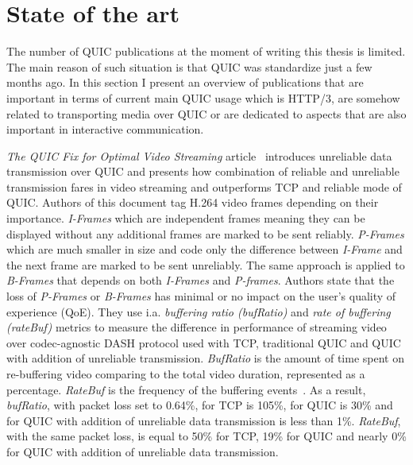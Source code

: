 \section{State of the art}
\label{sec:state-of-the-art}

The number of QUIC publications at the moment of writing this thesis is limited.
The main reason of such situation is that QUIC was standardize just a few months ago.
In this section I present an overview of publications that are important in terms of current main QUIC usage which is
HTTP/3, are somehow related to transporting media over QUIC or are dedicated to aspects that are also important
in interactive communication.

\textit{The QUIC Fix for Optimal Video Streaming} article~\cite{the-quic-fix-for-optimal-video-streaming} introduces unreliable data transmission over QUIC and presents how combination of reliable and unreliable transmission fares in video streaming and outperforms TCP and reliable mode of QUIC\@.
Authors of this document tag H.264 video frames depending on their importance.
\textit{I-Frames} which are independent frames meaning they can be displayed without any additional frames are marked to be sent reliably.
\textit{P-Frames} which are much smaller in size and code only the difference between \textit{I-Frame} and the next frame are marked to be sent unreliably.
The same approach is applied to \textit{B-Frames} that depends on both \textit{I-Frames} and \textit{P-frames}.
Authors state that the loss of \textit{P-Frames} or \textit{B-Frames} has minimal or no impact on the user's quality of experience (QoE).
They use i.a. \textit{buffering ratio (bufRatio)} and \textit{rate of buffering (rateBuf)} metrics to measure the difference in performance of streaming video over codec-agnostic DASH protocol used with TCP, traditional QUIC and QUIC with addition of unreliable transmission.
\textit{BufRatio} is the amount of time spent on re-buffering video comparing to the total video duration, represented as a percentage.
\textit{RateBuf} is the frequency of the buffering events~\cite{impact-of-video-quality-on-user-engagement}.
As a result, \textit{bufRatio}, with packet loss set to 0.64\%, for TCP is 105\%, for QUIC is 30\% and for QUIC with addition of unreliable data transmission is less than 1\%.
\textit{RateBuf}, with the same packet loss, is equal to 50\% for TCP, 19\% for QUIC and nearly 0\% for QUIC with addition of unreliable data transmission.

